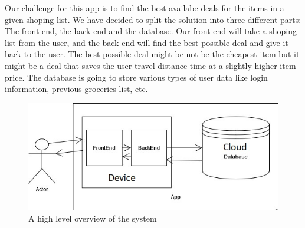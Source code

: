 Our challenge for this app is to find the best availabe deals for the items in a given shoping list.
We have decided to split the solution into three different parts: The front end, the back end and the database.
Our front end will take a shoping list from the user, and the back end will find the best possible deal and give it back to the user.
The best possible deal might be not be the cheapest item but it might be a deal that saves the user travel distance time at a slightly higher item price.
The database is going to store various types of user data like login information, previous groceries list, etc.

\begin{figure}
    \includegraphics{images/system diagram.jpg}
    \caption{A high level overview of the system}
\end{figure}
